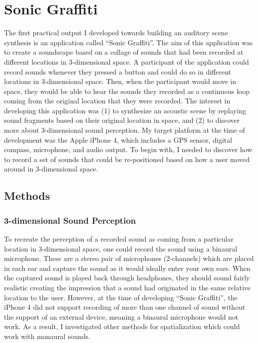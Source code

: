 \section{Sonic Graffiti}

The first practical output I developed towards building an auditory scene synthesis is an application called ``Sonic Graffiti''.  The aim of this application was to create a soundscape based on a collage of sounds that had been recorded at different locations in 3-dimensional space.  A participant of the application could record sounds whenever they pressed a button and could do so in different locations in 3-dimensional space.  Then, when the participant would move in space, they would be able to hear the sounds they recorded as a continuous loop coming from the original location that they were recorded.  The interest in developing this application was (1) to synthesize an acoustic scene by replaying sound fragments based on their original location in space, and (2) to discover more about 3-dimensional sound perception.  My target platform at the time of development was the Apple iPhone 4, which includes a GPS sensor, digital compass, microphone, and audio output.  To begin with, I needed to discover how to record a set of sounds that could be re-positioned based on how a user moved around in 3-dimensional space.

\subsection{Methods}

\subsubsection{3-dimensional Sound Perception}\label{sec:binauralization}
To recreate the perception of a recorded sound as coming from a particular location in 3-dimensional space, one could record the sound using a binaural microphone.  These are a stereo pair of microphones (2-channels) which are placed in each ear and capture the sound as it would ideally enter your own ears.  When the captured sound is played back through headphones, they should sound fairly realistic creating the impression that a sound had originated in the same relative location to the user.  However, at the time of developing ``Sonic Graffiti'', the iPhone 4 did not support recording of more than one channel of sound without the support of an external device, meaning a binaural microphone would not work.  As a result, I investigated other methods for spatialization which could work with monaural sounds.

